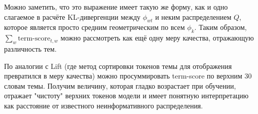 Можно заметить, что это выражение имеет такую же форму, как и одно слагаемое в расчёте KL-дивергенции между $\phi_{wt}$ и неким распределением $Q$, которое является просто средним геометрическим по всем $\phi_{k}$. Таким образом, $\sum_{w} \text{term-score}_{t,w}$ можно рассмотреть как ещё одну меру качества, отражающую различность тем.

По аналогии с Lift (где метод сортировки токенов темы для отображения превратился в меру качества) можно просуммировать term-score по верхним 30 словам темы. Получим величину, которая гладко возрастает при обучении, отражает "чистоту" верхних токенов модели и имеет понятную интерпретацию как расстояние от известного неинформативного распределения.

